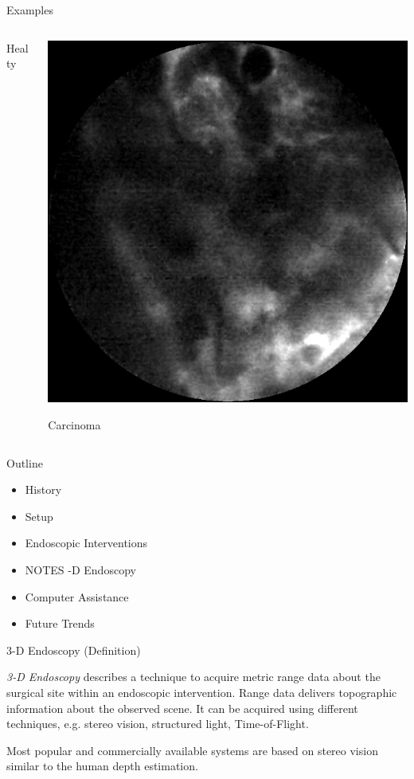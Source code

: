 \begin{frame}{Examples}
\begin{columns}[T]
\begin{column}{0.45\textwidth}
			Healty
		\end{column}%
		\begin{column}{0.45\textwidth}
			\centering
			\includegraphics[height=0.75\textheight]{img2/carcinoma.png}

			Carcinoma
		\end{column}
	\end{columns}
\end{frame}

\begin{frame}{Outline}
	\begin{itemize}
		\item History
		\item Setup
		\item Endoscopic Interventions
		\item NOTES
		      -D Endoscopy
		\item Computer Assistance
		\item Future Trends
	\end{itemize}
\end{frame}



\begin{frame}{3-D Endoscopy (Definition)}

	\begin{myDefinition}
		\textit{3-D Endoscopy} describes a technique to acquire metric range data about the surgical site within an endoscopic intervention. Range data delivers topographic information about the observed scene. It can be acquired using different techniques, e.g. stereo vision, structured light, Time-of-Flight.

		Most popular and commercially available systems are based on stereo vision similar to the human depth estimation.
	\end{myDefinition}
\end{frame}



